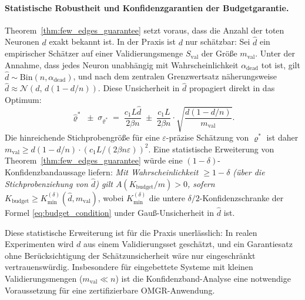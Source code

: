 \documentclass[12pt, a4paper, openany]{report}
\newcommand{\eps}{\varepsilon}
\begin{document}
\paragraph{Statistische Robustheit und Konfidenzgarantien der Budgetgarantie.}
Theorem~\ref{thm:few_edges_guarantee} setzt voraus, dass die Anzahl der
toten Neuronen $d$ exakt bekannt ist.  In der Praxis ist $d$ nur
schätzbar: Sei $\hat{d}$ ein empirischer Schätzer auf einer
Validierungsmenge $S_{\mathrm{val}}$ der Größe $m_{\mathrm{val}}$.  Unter
der Annahme, dass jedes Neuron unabhängig mit Wahrscheinlichkeit
$\alpha_{\mathrm{dead}}$ tot ist, gilt
$\hat{d} \sim \mathrm{Bin}(n, \alpha_{\mathrm{dead}})$, und nach dem
zentralen Grenzwertsatz näherungsweise
$\hat{d} \approx \mathcal{N}(d,\,d(1 - d/n))$.  Diese Unsicherheit in
$\hat{d}$ propagiert direkt in das Optimum:
\[
  \hat\varrho^* \;\pm\; \sigma_{\varrho^*}
  \;=\; \frac{c_1 L \hat{d}}{2\beta n}
  \;\pm\; \frac{c_1 L}{2\beta n}
  \cdot\sqrt{\frac{d(1-d/n)}{m_{\mathrm{val}}}}.
\]
Die hinreichende Stichprobengröße für eine $\eps$-präzise Schätzung von
$\varrho^*$ ist daher
$m_{\mathrm{val}} \geq d(1-d/n) \cdot (c_1 L / (2\beta n \eps))^2$.  Eine
statistische Erweiterung von Theorem~\ref{thm:few_edges_guarantee} würde
eine $(1-\delta)$-Konfidenzbandaussage liefern: \emph{Mit Wahrscheinlichkeit
$\geq 1-\delta$ (über die Stichprobenziehung von $\hat{d}$) gilt
$A(K_{\mathrm{budget}}/m) > 0$, sofern}
$K_{\mathrm{budget}} \geq K^{(\delta)}_{\mathrm{min}}(\hat{d}, m_{\mathrm{val}})$,
wobei $K^{(\delta)}_{\mathrm{min}}$ die untere $\delta/2$-Konfidenzschranke
der Formel \eqref{eq:budget_condition} under Gauß-Unsicherheit in $\hat{d}$ ist.

Diese statistische Erweiterung ist für die Praxis unerlässlich: In realen
Experimenten wird $d$ aus einem Validierungsset geschätzt, und ein Garantie\-satz
ohne Berücksichtigung der Schätzunsicherheit wäre nur eingeschränkt
vertrauenswürdig.  Insbesondere für eingebettete Systeme mit kleinen
Validierungsmengen ($m_{\mathrm{val}} \ll n$) ist die Konfidenz\-band-Analyse
eine notwendige Voraussetzung für eine zertifizierbare OMGR-Anwendung.
\end{document}

